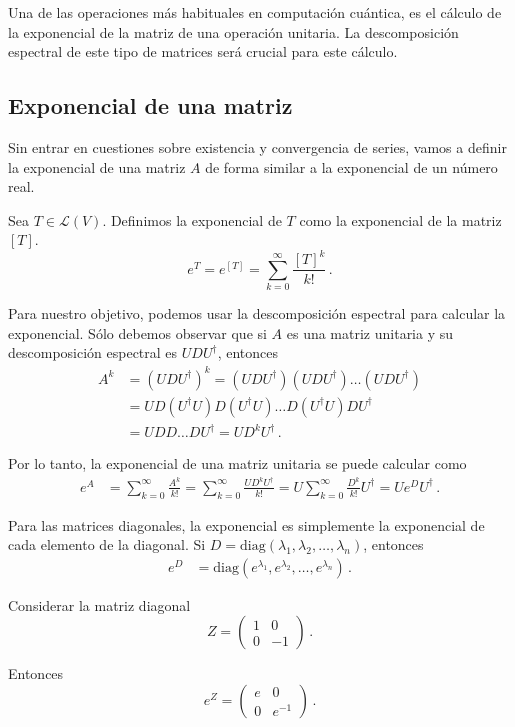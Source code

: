 Una de las operaciones más habituales en computación cuántica, es el cálculo de la exponencial de la matriz de una operación unitaria. La descomposición espectral de este tipo de matrices será crucial para este cálculo.

\subsection{Exponencial de una matriz}

Sin entrar en cuestiones sobre existencia y convergencia de series, vamos a definir la exponencial de una matriz $A$ de forma similar a la exponencial de un número real.

\begin{defi}
  Sea $T \in \mathcal{L}(V)$.
  Definimos la exponencial de $T$ como la exponencial de la matriz $[T]$.
  \[
    e^T = e^{[T]} = \sum_{k=0}^\infty \frac{[T]^k}{k!}\,.
  \]
\end{defi}

Para nuestro objetivo, podemos usar la descomposición espectral para calcular la exponencial. Sólo debemos observar que si $A$ es una matriz unitaria y su descomposición espectral es $U D U^\dagger$, entonces
\begin{align*}
  A^k & = (U D U^\dagger)^k = (U D U^\dagger)(U D U^\dagger)\dots (U D U^\dagger) \\
      & = U D (U^\dagger U)D (U^\dagger U)\dots D (U^\dagger U)DU^\dagger         \\
      & = U D D\dots DU^\dagger = U D^k U^\dagger\,.
\end{align*}

Por lo tanto, la exponencial de una matriz unitaria se puede calcular como
\begin{align*}
  e^A & = \sum_{k=0}^\infty \frac{A^k}{k!} = \sum_{k=0}^\infty \frac{U D^k U^\dagger}{k!} = U \sum_{k=0}^\infty \frac{D^k}{k!} U^\dagger = U e^D U^\dagger\,.
\end{align*}

Para las matrices diagonales, la exponencial es simplemente la exponencial de cada elemento de la diagonal. Si $D=\text{diag}(\lambda_1, \lambda_2, \dots, \lambda_n)$, entonces
\begin{align*}
  e^D & = \text{diag}(e^{\lambda_1}, e^{\lambda_2}, \dots, e^{\lambda_n})\,.
\end{align*}

\begin{eje}
  \label{eje:exponencial_z}
  Considerar la matriz diagonal
  \[
    Z = \begin{pmatrix} 1 & 0 \\ 0 & -1 \end{pmatrix}\,.
  \]

  Entonces
  \[
    e^Z = \begin{pmatrix} e & 0 \\ 0 & e^{-1} \end{pmatrix}\,.
  \]
\end{eje}

